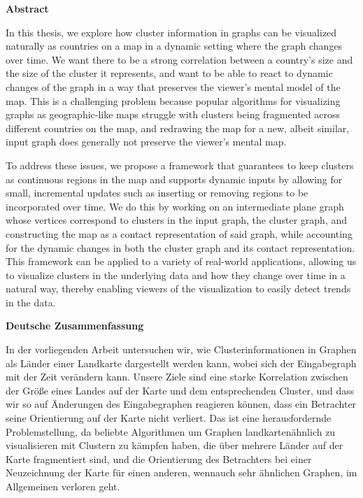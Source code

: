 \begin{addmargin}{0.5cm}

\centerline{\textbf{Abstract}}

In this thesis, we explore how cluster information in graphs can be visualized naturally as countries on a map in a dynamic setting where the graph changes over time.
We want there to be a strong correlation between a country's size and the size of the cluster it represents, and want to be able to react to dynamic changes of the graph in a way that preserves the viewer's mental model of the map.
This is a challenging problem because popular algorithms for visualizing graphs as geographic-like maps struggle with clusters being fragmented across different countries on the map, and redrawing the map for a new, albeit similar, input graph does generally not preserve the viewer's mental map.

To address these issues, we propose a framework that guarantees to keep clusters as continuous regions in the map and supports dynamic inputs by allowing for small, incremental updates such as inserting or removing regions to be incorporated over time.
We do this by working on an intermediate plane graph whose vertices correspond to clusters in the input graph, the cluster graph, and constructing the map as a contact representation of said graph, while accounting for the dynamic changes in both the cluster graph and its contact representation.
This framework can be applied to a variety of real-world applications, allowing us to visualize clusters in the underlying data and how they change over time in a natural way, thereby enabling viewers of the visualization to easily detect trends in the data.

\vskip 2cm

\centerline{\textbf{Deutsche Zusammenfassung}}

In der vorliegenden Arbeit untersuchen wir, wie Clusterinformationen in Graphen als Länder einer Landkarte dargestellt werden kann, wobei sich der Eingabegraph mit der Zeit verändern kann.
Unsere Ziele sind eine starke Korrelation zwischen der Größe eines Landes auf der Karte und dem entsprechenden Cluster, und dass wir so auf Änderungen des Eingabegraphen reagieren können, dass ein Betrachter seine Orientierung auf der Karte nicht verliert.
Das ist eine herausfordernde Problemstellung, da beliebte Algorithmen um Graphen landkartenähnlich zu visualisieren mit Clustern zu kämpfen haben, die über mehrere Länder auf der Karte fragmentiert sind, und die Orientierung des Betrachters bei einer Neuzeichnung der Karte für einen anderen, wennauch sehr ähnlichen Graphen, im Allgemeinen verloren geht.


\end{addmargin}
